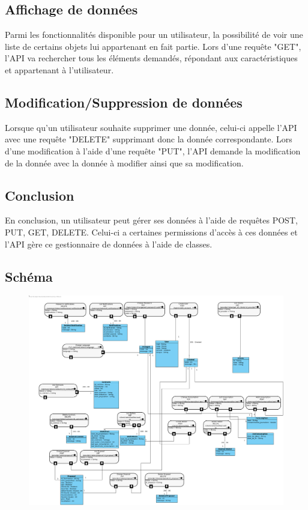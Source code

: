 \subsection{Affichage de données}
\begin{flushleft}
Parmi les fonctionnalités disponible pour un utilisateur, la possibilité de voir une liste de certains objets lui appartenant en fait partie. Lors d'une requête "GET", l'API va rechercher tous les éléments demandés, répondant aux caractéristiques et appartenant à l'utilisateur.
\end{flushleft}

\subsection{Modification/Suppression de données}
\begin{flushleft}
Lorsque qu'un utilisateur souhaite supprimer une donnée, celui-ci appelle l'API avec une requête "DELETE" supprimant donc la donnée correspondante. Lors d'une modification à l'aide d'une requête "PUT", l'API demande la modification de la donnée avec la donnée à modifier ainsi que sa modification.
\end{flushleft}

\subsection{Conclusion}
\begin{flushleft}
En conclusion, un utilisateur peut gérer ses données à l'aide de requêtes POST, PUT, GET, DELETE. Celui-ci a certaines permissions d'accès à ces données et l'API gère ce gestionnaire de données à l'aide de classes.
\newpage

\end{flushleft}
\subsection{Schéma}
\begin{figure}[h]
\includegraphics[width = 1.3\textwidth]{Base/api-rest/img/apirest.png}
\end{figure}

